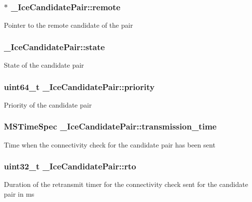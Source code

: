 \subsubsection[{remote}]{$\ast$ \-\_\-\-Ice\-Candidate\-Pair\-::remote}\label{struct__IceCandidatePair_ab9021218927f7822d741502588bec905}
Pointer to the remote candidate of the pair 
\subsubsection[{state}]{ \-\_\-\-Ice\-Candidate\-Pair\-::state}\label{struct__IceCandidatePair_a7cdb53031897601cced2d853381361d5}
State of the candidate pair 
\subsubsection[{priority}]{\setlength{\rightskip}{0pt plus 5cm}uint64\-\_\-t \-\_\-\-Ice\-Candidate\-Pair\-::priority}\label{struct__IceCandidatePair_ae9c22b971ffe5c3ca287c6a5ef23c8e8}
Priority of the candidate pair 
\subsubsection[{transmission\-\_\-time}]{\setlength{\rightskip}{0pt plus 5cm}M\-S\-Time\-Spec \-\_\-\-Ice\-Candidate\-Pair\-::transmission\-\_\-time}\label{struct__IceCandidatePair_a7d20e43f7f8338deecfde0508b11f5ec}
Time when the connectivity check for the candidate pair has been sent 
\subsubsection[{rto}]{\setlength{\rightskip}{0pt plus 5cm}uint32\-\_\-t \-\_\-\-Ice\-Candidate\-Pair\-::rto}\label{struct__IceCandidatePair_a2f33ff606ddf4fa90eef726bc39bb3c2}
Duration of the retransmit timer for the connectivity check sent for the candidate pair in ms 
